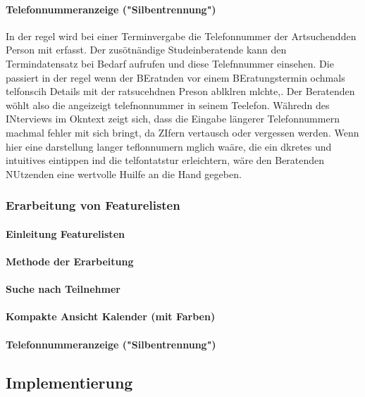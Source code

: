 \documentclass[12pt]{article}
\begin{document}
\paragraph{Telefonnummeranzeige ("Silbentrennung")}
In der regel wird bei einer Terminvergabe die Telefonnummer der Artsuchendden Person mit erfasst. Der zusötnändige Studeinberatende kann den Termindatensatz bei Bedarf aufrufen und diese Telefnnummer einsehen. Die passiert in der regel wenn der BEratnden vor einem BEratungstermin ochmals telfonscih Details mit der ratsucehdnen Preson ablklren mlchte,. Der Beratenden wöhlt also die angeizeigt telefnonnummer in seinem Teelefon. Währedn des INterviews im Okntext zeigt sich, dass die Eingabe längerer Telefonnummern machmal fehler mit sich bringt, da ZIfern vertausch oder vergessen werden. Wenn hier eine darstellung langer teflonnumern mglich waäre, die ein dkretes und intuitives eintippen ind die telfontatstur erleichtern, wäre den Beratenden NUtzenden eine wertvolle Huilfe an die Hand gegeben. 

\subsubsection{Erarbeitung von Featurelisten}

\paragraph{Einleitung Featurelisten}
\paragraph{Methode der Erarbeitung}
\paragraph{Suche nach Teilnehmer}
\paragraph{Kompakte Ansicht Kalender (mit Farben)}
\paragraph{Telefonnummeranzeige ("Silbentrennung")}

\subsection{Implementierung}
\end{document}
